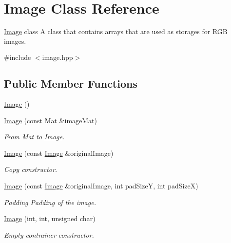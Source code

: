 \hypertarget{classImage}{}\section{Image Class Reference}
\label{classImage}


\mbox{\hyperlink{classImage}{Image}} class A class that contains arrays that are used as storages for R\+GB images.  




{\ttfamily \#include $<$image.\+hpp$>$}

\subsection*{Public Member Functions}
\begin{DoxyCompactItemize}
\item 
\mbox{\hyperlink{classImage_a58edd1c45b4faeb5f789b0d036d02313}{Image}} ()
\item 
\mbox{\hyperlink{classImage_adc39a6501723c1f780b60ad9893f9c4b}{Image}} (const Mat \&image\+Mat)
\begin{DoxyCompactList}\small\item\em From Mat to \mbox{\hyperlink{classImage}{Image}}. \end{DoxyCompactList}\item 
\mbox{\hyperlink{classImage_a30440c1cf34a9903677f01beeba11fc6}{Image}} (const \mbox{\hyperlink{classImage}{Image}} \&original\+Image)
\begin{DoxyCompactList}\small\item\em Copy constructor. \end{DoxyCompactList}\item 
\mbox{\hyperlink{classImage_a4659ef8497580de3385deecd66ff948e}{Image}} (const \mbox{\hyperlink{classImage}{Image}} \&original\+Image, int pad\+SizeY, int pad\+SizeX)
\begin{DoxyCompactList}\small\item\em Padding Padding of the image. \end{DoxyCompactList}\item 
\mbox{\hyperlink{classImage_a6fdf11ab4ab71e96364eaa874c0ffcb8}{Image}} (int, int, unsigned char)
\begin{DoxyCompactList}\small\item\em Empty contrainer constructor. \end{DoxyCompactList}\end{DoxyCompactItemize}
